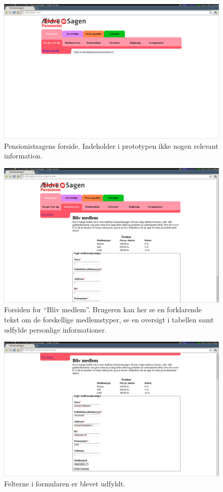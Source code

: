 \begin{figure}[h]
    \centering
    \includegraphics[width=.9\textwidth]{billeder/opgave1_trin1.png}
    \caption{Pensionistsagens forside. Indeholder i prototypen ikke nogen relevant information.}
    \label{fig:opg1_trin1}
\end{figure}
\begin{figure}[h]
    \centering
    \includegraphics[width=.9\textwidth]{billeder/opgave1_trin2.png}
    \caption{Forsiden for ``Bliv medlem''. Brugeren kan her se en forklarende tekst om de forskellige medlemstyper, se en oversigt i tabellen samt udfylde personlige informationer.}
    \label{fig:opg1_trin2}
\end{figure}
\begin{figure}[h]
    \centering
    \includegraphics[width=.9\textwidth]{billeder/opgave1_trin3.png}
    \caption{Felterne i formularen er blevet udfyldt.}
    \label{fig:opg1_trin3}
\end{figure}
